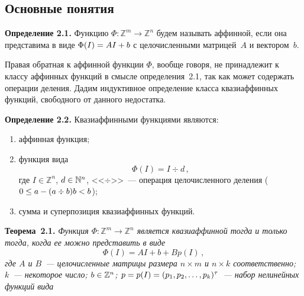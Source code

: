 \begin{multicols}{2}
\section{Основные понятия}


\smallskip

\noindent
\textbf{Определение 2.1.}
Функцию $\Phi:\mathbb{Z}^m\to\mathbb{Z}^n$ будем называть аффинной, если она представима в виде
$\Phi(I)\hm=AI\hm+b$ с целочисленными матрицей~$A$ и вектором~$b$.

\smallskip

Правая обратная к аффинной функции $\Phi$, вообще говоря, не
принадлежит к классу аффинных функций в смысле
определения~2.1, так как может содержать операции деления.
Дадим индуктивное определение класса квазиаффинных функций,
свободного от данного недостатка.

\smallskip

\noindent
\textbf{Определение 2.2.}
Квазиаффинными функциями являются:
\begin{enumerate}[1)]
\item аффинная функция;
\item функция вида
\begin{equation}
\Phi(I)=I\div d\,, \label{Idivd}
\end{equation}
где $I\in\mathbb{Z}^n$, $d\hm\in\mathbb{N}^n$, <<$\div$>>~--- 
операция цело\-чис\-лен\-но\-го деления ($0\hm\leq a-(a\div b)b\hm<b$);
\item сумма и суперпозиция квазиаффинных функций.
\end{enumerate}

\smallskip

\noindent
\textbf{Теорема~2.1.}
\textit{Функция $\Phi:\mathbb{Z}^m\to\mathbb{Z}^n$ является квазиаффинной тогда и только тогда, когда ее можно представить в виде
\begin{equation}
\Phi(I)=AI+b+Bp(I)\,, \label{defKwaziAff}
\end{equation}
где $A$ и $B$~--- целочисленные матрицы размера $n\times m$ и $n\times k$
соответственно; $k$~--- некоторое число; $b\hm\in\mathbb{Z}^n$; 
$p\hm=p(I)\hm=(p_1,p_2,\ldots,p_k)^\tau$~--- набор нелинейных функций вида}


\end{multicols}
